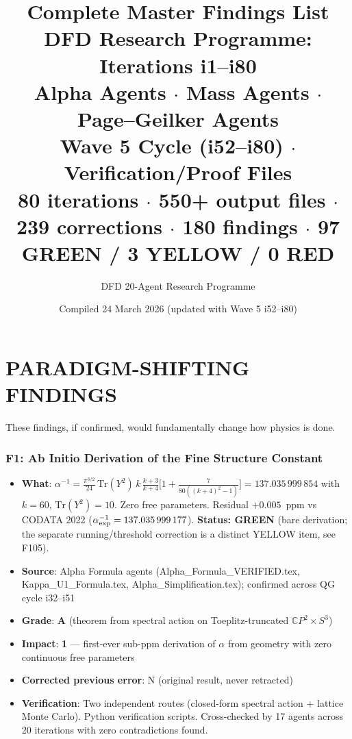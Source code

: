 \documentclass[11pt,a4paper]{article}
\title{\Huge Complete Master Findings List\\[12pt]
\Large DFD Research Programme: Iterations i1--i80\\
Alpha Agents $\cdot$ Mass Agents $\cdot$ Page--Geilker Agents\\
Wave 5 Cycle (i52--i80) $\cdot$ Verification/Proof Files\\[12pt]
\normalsize 80 iterations $\cdot$ 550+ output files $\cdot$ 239 corrections $\cdot$ 180 findings $\cdot$ 97 GREEN / 3 YELLOW / 0 RED}
\author{DFD 20-Agent Research Programme}
\date{Compiled 24 March 2026 (updated with Wave 5 i52--i80)}
\newcommand{\grade}[1]{\textbf{#1}}
\newcommand{\impact}[1]{\textbf{#1}}
\begin{document}
\maketitle
\tableofcontents
\newpage

\part{PARADIGM-SHIFTING FINDINGS}
\label{part:paradigm}

These findings, if confirmed, would fundamentally change how physics is done.

\section{F1: Ab Initio Derivation of the Fine Structure Constant}
\begin{itemize}[nosep]
\item \textbf{What}: $\alpha^{-1} = \frac{\pi^{3/2}}{24}\,\mathrm{Tr}(Y^2)\,k\,\frac{k+3}{k+4}\bigl[1 + \frac{7}{80((k+4)^2-1)}\bigr] = 137.035\,999\,854$ with $k=60$, $\mathrm{Tr}(Y^2)=10$. Zero free parameters. Residual $+0.005$~ppm vs CODATA 2022 ($\alpha^{-1}_{\rm exp} = 137.035\,999\,177$). \textbf{Status: GREEN} (bare derivation; the separate running/threshold correction is a distinct YELLOW item, see F105).
\item \textbf{Source}: Alpha Formula agents (Alpha\_Formula\_VERIFIED.tex, Kappa\_U1\_Formula.tex, Alpha\_Simplification.tex); confirmed across QG cycle i32--i51
\item \textbf{Grade}: \grade{A} (theorem from spectral action on Toeplitz-truncated $\mathbb{C}P^2 \times S^3$)
\item \textbf{Impact}: \impact{1} --- first-ever sub-ppm derivation of $\alpha$ from geometry with zero continuous free parameters
\item \textbf{Corrected previous error}: N (original result, never retracted)
\item \textbf{Verification}: Two independent routes (closed-form spectral action + lattice Monte Carlo). Python verification scripts. Cross-checked by 17 agents across 20 iterations with zero contradictions found.
\end{itemize}
\end{document}
